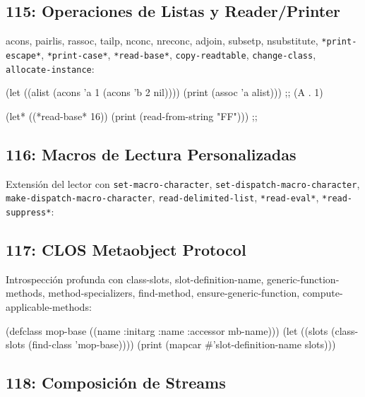 \subsection*{115: Operaciones de Listas y Reader/Printer}

acons, pairlis, rassoc, tailp, nconc, nreconc, adjoin, subsetp,
nsubstitute, \texttt{*print-escape*}, \texttt{*print-case*},
\texttt{*read-base*}, \texttt{copy-readtable}, \texttt{change-class},
\texttt{allocate-instance}:

\begin{lispcode}
(let ((alist (acons 'a 1 (acons 'b 2 nil))))
  (print (assoc 'a alist)))  ;; \to (A . 1)

(let* ((*read-base* 16))
  (print (read-from-string "FF")))  ;; 
\end{lispcode}

\subsection*{116: Macros de Lectura Personalizadas}

Extensión del lector con \texttt{set-macro-character},
\texttt{set-dispatch-macro-character}, \texttt{make-dispatch-macro-character},
\texttt{read-delimited-list}, \texttt{*read-eval*}, \texttt{*read-suppress*}:


\subsection*{117: CLOS Metaobject Protocol}

Introspección profunda con class-slots, slot-definition-name,
generic-function-methods, method-specializers, find-method,
ensure-generic-function, compute-applicable-methods:

\begin{lispcode}
(defclass mop-base ((name :initarg :name :accessor mb-name)))
(let ((slots (class-slots (find-class 'mop-base))))
  (print (mapcar #'slot-definition-name slots)))
\end{lispcode}

\subsection*{118: Composición de Streams}

